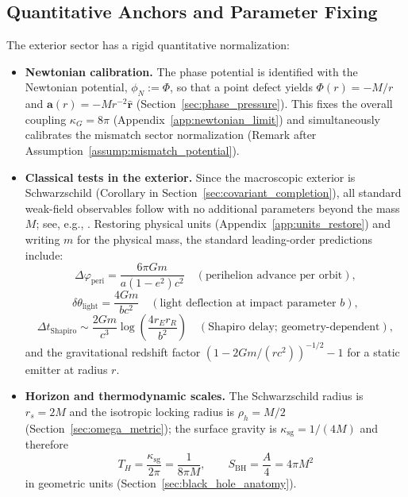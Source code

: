 \subsection*{Quantitative Anchors and Parameter Fixing}
The exterior sector has a rigid quantitative normalization:
\begin{itemize}
  \item \textbf{Newtonian calibration.} The phase potential is identified with the Newtonian potential, $\phi_N:=\Phi$, so that a point defect yields $\Phi(r)=-M/r$ and $\mathbf{a}(r)=-M r^{-2}\hat{\mathbf{r}}$ (Section~\ref{sec:phase_pressure}). This fixes the overall coupling $\kappa_G=8\pi$ (Appendix~\ref{app:newtonian_limit}) and simultaneously calibrates the mismatch sector normalization (Remark after Assumption~\ref{assump:mismatch_potential}).
  \item \textbf{Classical tests in the exterior.} Since the macroscopic exterior is Schwarzschild (Corollary in Section~\ref{sec:covariant_completion}), all standard weak-field observables follow with no additional parameters beyond the mass $M$; see, e.g., \cite{Will2014}. Restoring physical units (Appendix~\ref{app:units_restore}) and writing $m$ for the physical mass, the standard leading-order predictions include:
  \begin{equation}
    \Delta\varphi_{\mathrm{peri}}=\frac{6\pi Gm}{a(1-e^2)c^2}\quad(\text{perihelion advance per orbit}),
  \end{equation}
  \begin{equation}
    \delta\theta_{\mathrm{light}}=\frac{4Gm}{bc^2}\quad(\text{light deflection at impact parameter }b),
  \end{equation}
  \begin{equation}
    \Delta t_{\mathrm{Shapiro}}\sim \frac{2Gm}{c^3}\log\!\left(\frac{4r_E r_R}{b^2}\right)\quad(\text{Shapiro delay; geometry-dependent}),
  \end{equation}
  and the gravitational redshift factor $(1-2Gm/(rc^2))^{-1/2}-1$ for a static emitter at radius $r$.
  \item \textbf{Horizon and thermodynamic scales.} The Schwarzschild radius is $r_s=2M$ and the isotropic locking radius is $\rho_h=M/2$ (Section~\ref{sec:omega_metric}); the surface gravity is $\kappa_{\mathrm{sg}}=1/(4M)$ and therefore
  \begin{equation}
    T_H=\frac{\kappa_{\mathrm{sg}}}{2\pi}=\frac{1}{8\pi M},\qquad
    S_{\mathrm{BH}}=\frac{A}{4}=4\pi M^2
  \end{equation}
  in geometric units (Section~\ref{sec:black_hole_anatomy}).

\end{itemize}
